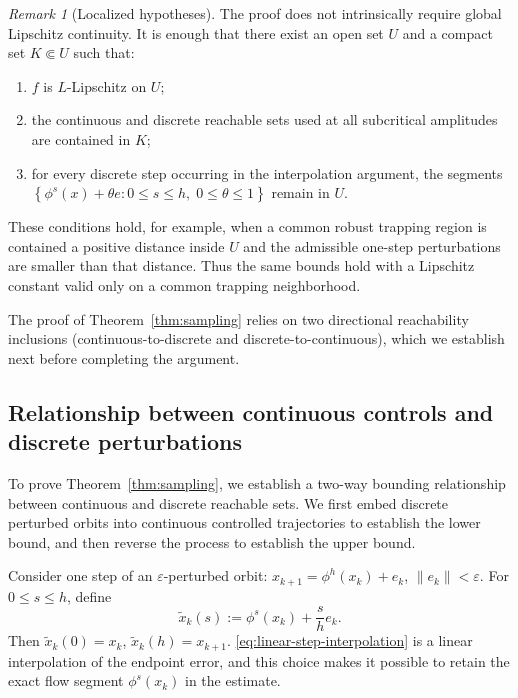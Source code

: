\documentclass[pdflatex,sn-mathphys-num]{sn-jnl}
\numberwithin{equation}{section}
\theoremstyle{thmstyleone}%
\theoremstyle{definition}
\theoremstyle{remark}
\newtheorem{remark}[theorem]{Remark}
\begin{document}
\begin{remark}[Localized hypotheses]
\label{rem:localized-sampling}
The proof does not intrinsically require global Lipschitz continuity. It is enough that there exist an open set $U$ and a compact set $K\Subset U$ such that:
\begin{enumerate}
\item $f$ is $L$-Lipschitz on $U$;
\item the continuous and discrete reachable sets used at all
subcritical amplitudes are contained in $K$;
\item for every discrete step occurring in the interpolation argument,
the segments
    $\left\{
    \phi^s(x)+\theta e:
    0\leq s\leq h,\;
    0\leq\theta\leq1
    \right\}$
remain in $U$.
\end{enumerate}
These conditions hold, for example, when a common robust trapping region is contained a positive distance inside $U$ and the admissible one-step perturbations are smaller than that distance. Thus the same bounds hold with a Lipschitz constant valid only on a common trapping neighborhood.
\end{remark}

The proof of Theorem~\ref{thm:sampling} relies on two directional reachability inclusions (continuous-to-discrete and discrete-to-continuous), which we establish next before completing the argument.

\subsection{Relationship between continuous controls and discrete perturbations}
\label{subsec:discrete-to-continuous}

To prove Theorem~\ref{thm:sampling}, we establish a two-way bounding relationship between continuous and discrete reachable sets. We first embed discrete perturbed orbits into continuous controlled trajectories to establish the lower bound, and then reverse the process to establish the upper bound.

Consider one step of an $\varepsilon$-perturbed orbit:
    $x_{k+1}=\phi^h(x_k)+e_k$,
    $\|e_k\|<\varepsilon$.
For $0\leq s\leq h$, define
\begin{equation}
\label{eq:linear-step-interpolation}
    \widetilde x_k(s)
    :=
    \phi^s(x_k)+\frac{s}{h}e_k.
\end{equation}
Then $\widetilde x_k(0)=x_k$, $\widetilde x_k(h)=x_{k+1}$. \eqref{eq:linear-step-interpolation} is a linear interpolation of the endpoint error, and this choice makes it possible to retain the exact flow segment $\phi^s(x_k)$ in the estimate.
\end{document}
